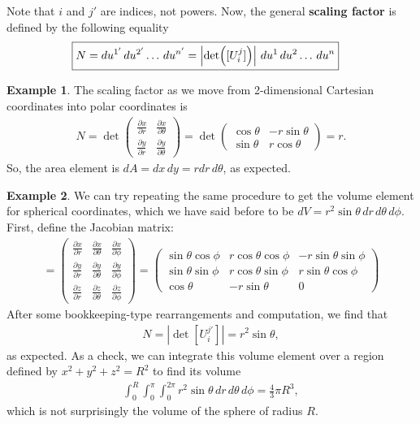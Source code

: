 \documentclass{article}
\theoremstyle{definition}
\newtheorem{exmp}{Example}[section]
\begin{document}
Note that $i$ and $j'$ are indices, not powers. Now, the general \textbf{scaling factor} is defined by the following equality
\begin{align*}
\Aboxed{N = du^{1'}\,du^{2'}\dots\,du^{n'} = \left| \det([U^{j}_{i}])\right| \,du^1\,du^2\dots\,du^{n}}
\end{align*}
\begin{exmp}
The scaling factor as we move from 2-dimensional Cartesian coordinates into polar coordinates is
\begin{align*}
N = \det\begin{pmatrix}
\frac{\partial x}{\partial r} & \frac{\partial x}{\partial \theta}\\
\frac{\partial y}{\partial r} & \frac{\partial y}{\partial \theta}
\end{pmatrix}
=
\det\begin{pmatrix}
\cos\theta & -r\sin\theta\\
\sin\theta & r\cos\theta
\end{pmatrix}
=
r.
\end{align*}
So, the area element is $dA = dx\,dy = rdr\,d\theta$, as expected. 
\end{exmp}
\begin{exmp}
We can try repeating the same procedure to get the volume element for spherical coordinates, which we have said before to be $dV = r^2\sin\theta\,dr\,d\theta\,d\phi$. First, define the Jacobian matrix:
\begin{align*}
[U^{j'}_{i}] = \begin{pmatrix}
\frac{\partial x}{\partial r} & \frac{\partial x}{\partial \theta} & \frac{\partial x}{\partial \phi}\\
\frac{\partial y}{\partial r} & \frac{\partial y}{\partial \theta} & \frac{\partial y}{\partial \phi}\\
\frac{\partial z}{\partial r} & \frac{\partial z}{\partial \theta} & \frac{\partial z}{\partial \phi}
\end{pmatrix}
=
\begin{pmatrix}
\sin\theta\cos\phi & r\cos\theta\cos\phi & -r\sin\theta\sin\phi \\
\sin\theta\sin\phi & r\cos\theta\sin\phi & r\sin\theta\cos\phi \\
\cos\theta & -r\sin\theta & 0
\end{pmatrix}
\end{align*}
After some bookkeeping-type rearrangements and computation, we find that
\begin{align*}
N = \left|\det[U^{j'}_{i}]\right|= r^2\sin\theta,
\end{align*}
as expected. As a check, we can integrate this volume element over a region defined by $x^2+y^2+z^2 = R^2$ to find its volume
\begin{align*}
\int_{0}^{R}\int_{0}^{\pi}\int_{0}^{2\pi}r^2\sin\theta\,dr\,d\theta\,d\phi = \frac{4}{3}\pi R^3,
\end{align*}
which is not surprisingly the volume of the sphere of radius $R$. 
\end{exmp}
\newpage
\end{document}
